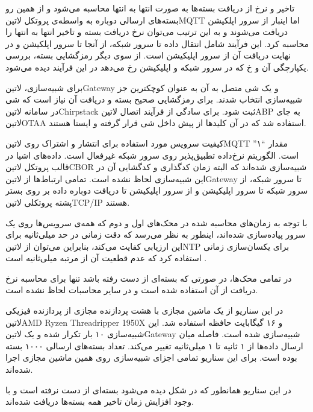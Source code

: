 تاخیر و نرخ از دریافت بسته‌ها به صورت انتها به انتها محاسبه می‌شود و از همین رو بسته‌های ارسالی دوباره به واسطه‌ی پروتکل ‌لاتین{MQTT} اما اینبار از سرور اپلکیشن
دریافت می‌شوند و به این ترتیب می‌توان نرخ دریافت بسته و تاخیر انتها به انتها را محاسبه کرد. این فرآیند شامل انتقال داده تا سرور شبکه، از آنجا تا سرور اپلکیشن و در نهایت
دریافت آن از سرور اپلیکیشن است. از سوی دیگر رمزگشایی بسته، بررسی یکپارچگی آن و ‌خ که در سرور شبکه و اپلیکیشن رخ می‌دهد در این فرآیند دیده می‌شود.

برای شبیه‌سازی، ‌لاتین{Gateway} و یک شی متصل به آن به عنوان کوچکترین جز شبیه‌سازی انتخاب شدند. برای رمزگشایی صحیح بسته و دریافت آن نیاز است
که شی در سامانه ‌لاتین{Chirpstack} ثبت شود. برای سادگی از فرآیند اتصال ‌لاتین{ABP} به جای ‌لاتین{OTAA} استفاده شد که در آن کلیدها از پیش
داخل شی قرار گرفته و ایستا هستند.

کیفیت سرویس مورد استفاده برای انتشار و اشتراک روی ‌لاتین{MQTT} مقدار ``۱'' است. الگوریتم نرخ‌داده تطبیق‌پذیر روی سرور شبکه غیرفعال است.
داده‌های اشیا در قالب پروتکل ‌لاتین{CBOR} شبیه‌سازی شده‌اند که البته زمان کدگذاری و کدگشایی آن در این شبیه‌سازی لحاظ نشده است.
تمامی ارتباط‌ها از ‌لاتین{Gateway} تا سرور شبکه، از سرور شبکه تا سرور اپلیکیشن و از سرور اپلیکیشن تا دریافت دوباره داده
بر روی بستر پشته پروتکلی ‌لاتین{TCP/IP} هستند.

با توجه به زمان‌های محاسبه شده در محک‌های اول و دوم که همه‌ی سرویس‌ها روی یک سرور پیاده‌سازی شده‌اند، اینطور به نظر می‌رسد که دقت زمانی در حد میلی‌ثانیه
برای این ارزیابی کفایت می‌کند، بنابراین می‌توان از ‌لاتین{NTP} برای یکسان‌سازی زمانی استفاده کرد که عدم قطعیت آن از مرتبه میلی‌ثانیه است .

در تمامی محک‌ها، در صورتی که بسته‌ای از دست رفته باشد تنها برای محاسبه نرخ دریافت از آن استفاده شده است و در سایر محاسبات لحاظ نشده است.


در این سناریو از یک ماشین مجازی با هشت پردازنده مجازی از پردازنده فیزیکی
‌لاتین{AMD Ryzen Threadripper 1950X}
و ۱۶ گیگابایت حافظه استفاده شد.
این شبیه‌سازی ۱۰ بار تکرار شده
و یک ‌لاتین{Gateway} شبیه‌سازی شده است. فاصله میان ارسال داده‌ها از ۱ ثانیه تا ۱ میلی‌ثانیه تغییر می‌کند.
تعداد بسته‌های ارسالی ۱۰۰۰ بسته بوده است.
برای این سناریو تمامی اجزای شبیه‌سازی روی همین ماشین مجازی اجرا شده‌اند.

در این سناریو همانطور که در شکل 
دیده می‌شود بسته‌ای از دست نرفته است و با وجود افزایش زمان تاخیر همه بسته‌ها دریافت شده‌اند.

